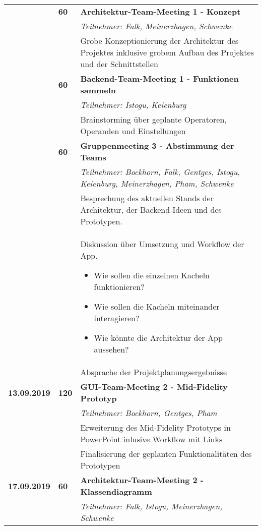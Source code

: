 {{\begin{longtable}{|l|l|p{11cm}|}
		\\ \cline{2-3}
		& \textbf{\hfill60} & \textbf{Architektur-Team-Meeting 1 - Konzept} 
			\\ & &
			\small{\textit{Teilnehmer: Falk, Meinerzhagen, Schwenke}}
			\\ & &
			Grobe Konzeptionierung der Architektur des Projektes inklusive grobem Aufbau des Projektes und der Schnittstellen  
		\\ \cline{2-3}
		& \textbf{\hfill60} & \textbf{Backend-Team-Meeting 1 - Funktionen sammeln} 
			\\ & &
			\small{\textit{Teilnehmer: Istogu, Keienburg}}
			\\ & &
			Brainstorming über geplante Operatoren, Operanden und Einstellungen
		\\ \cline{2-3}
		& \textbf{\hfill60} & \textbf{Gruppenmeeting 3 - Abstimmung der Teams} 
			\\ & &
			\small{\textit{Teilnehmer: Bockhorn, Falk, Gentges, Istogu, Keienburg, Meinerzhagen, Pham, Schwenke}}
			\\ & &
			Besprechung des aktuellen Stands der Architektur, der Backend-Ideen und des Prototypen.
			\\ & &
			Diskussion über Umsetzung und Workflow der App.
			\begin{itemize}\renewcommand\labelitemi{--}
				\item  Wie sollen die einzelnen Kacheln funktionieren?
				\item Wie sollen die Kacheln miteinander interagieren?
				\item Wie könnte die Architektur der App aussehen?
			\end{itemize}
			\\ & &
			Absprache der Projektplanungsergebnisse
	\\\hline
		\textbf{13.09.2019} 
			& \hfill\textbf{120} & \textbf{GUI-Team-Meeting 2 - Mid-Fidelity Prototyp} 
			\\ & &
			\small{\textit{Teilnehmer: Bockhorn, Gentges, Pham}}
			\\ & &
			Erweiterung des Mid-Fidelity Prototyps in PowerPoint inlusive Workflow mit Links
			\\ & &
			Finalisierung der geplanten Funktionalitäten des Prototypen
	\\\hline
		\textbf{17.09.2019} 
			& \hfill \textbf{ 60} & \textbf{Architektur-Team-Meeting 2 - Klassendiagramm}
			\\ & &
			\small{\textit{Teilnehmer: Falk, Istogu, Meinerzhagen, Schwenke}}

\end{longtable}}}

